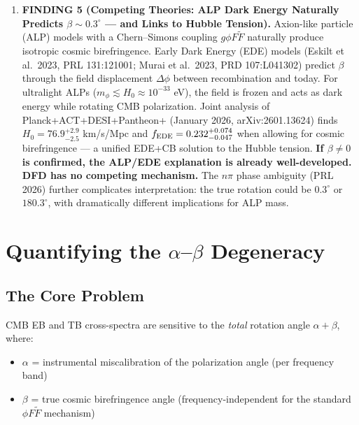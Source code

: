\documentclass[11pt]{article}
\newcommand{\CS}{Chern--Simons}
\begin{document}
\begin{tcolorbox}[colback=red!5!white, colframe=red!70!black,
  title=\textbf{TOP 5 FINDINGS (Ranked by Impact on DFD Survival)}]
\begin{enumerate}
\item \textbf{FINDING 5 (Competing Theories: ALP Dark Energy Naturally
  Predicts $\beta \sim 0.3^\circ$ --- and Links to Hubble Tension).}
  Axion-like particle (ALP) models with a \CS{} coupling
  $g\phi F\tilde{F}$ naturally produce isotropic cosmic birefringence.
  Early Dark Energy (EDE) models (Eskilt et al.\ 2023, PRL 131:121001;
  Murai et al.\ 2023, PRD 107:L041302) predict $\beta$ through
  the field displacement $\Delta\phi$ between recombination and today.
  For ultralight ALPs ($m_\phi \lesssim H_0 \approx 10^{-33}$ eV),
  the field is frozen and acts as dark energy while rotating CMB
  polarization.  Joint analysis of Planck+ACT+DESI+Pantheon+
  (January 2026, arXiv:2601.13624) finds $H_0 = 76.9^{+2.9}_{-2.5}$
  km/s/Mpc and $f_{\rm EDE} = 0.232^{+0.074}_{-0.047}$ when
  allowing for cosmic birefringence --- a unified EDE+CB solution
  to the Hubble tension.  \textbf{If $\beta \neq 0$ is confirmed,
  the ALP/EDE explanation is already well-developed.  DFD has no
  competing mechanism.}  The $n\pi$ phase ambiguity (PRL 2026)
  further complicates interpretation: the true rotation could be
  $0.3^\circ$ or $180.3^\circ$, with dramatically different
  implications for ALP mass.
\end{enumerate}
\end{tcolorbox}


\section{Quantifying the $\alpha$--$\beta$ Degeneracy}
\label{sec:degeneracy}

\subsection{The Core Problem}

CMB EB and TB cross-spectra are sensitive to the \emph{total} rotation
angle $\alpha + \beta$, where:
\begin{itemize}
\item $\alpha$ = instrumental miscalibration of the polarization angle
  (per frequency band)
\item $\beta$ = true cosmic birefringence angle (frequency-independent
  for the standard $\phi F\tilde{F}$ mechanism)
\end{itemize}
\end{document}
